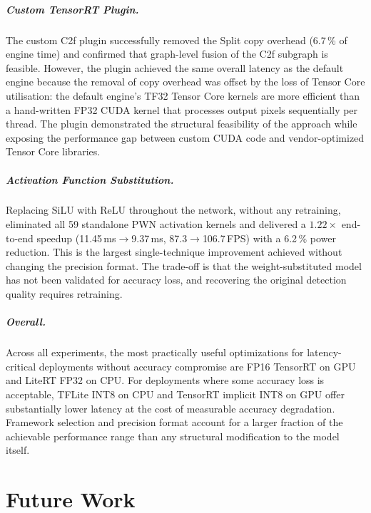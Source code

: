 \documentclass[12pt,a4paper]{report}
\begin{document}
\paragraph{Custom TensorRT Plugin.}
The custom C2f plugin successfully removed the Split copy overhead (6.7\,\% of engine time) and confirmed that
graph-level fusion of the C2f subgraph is feasible.
However, the plugin achieved the same overall latency as the default engine because the removal of copy overhead was
offset by the loss of Tensor Core utilisation: the default engine's TF32 Tensor Core kernels are more efficient than
a hand-written FP32 CUDA kernel that processes output pixels sequentially per thread.
The plugin demonstrated the structural feasibility of the approach while exposing the performance gap between custom
CUDA code and vendor-optimized Tensor Core libraries.

\paragraph{Activation Function Substitution.}
Replacing SiLU with ReLU throughout the network, without any retraining, eliminated all 59 standalone PWN activation
kernels and delivered a $1.22\times$ end-to-end speedup (11.45\,ms$\to$9.37\,ms, 87.3$\to$106.7\,FPS) with a
6.2\,\% power reduction.
This is the largest single-technique improvement achieved without changing the precision format.
The trade-off is that the weight-substituted model has not been validated for accuracy loss, and recovering the
original detection quality requires retraining.

\paragraph{Overall.}
Across all experiments, the most practically useful optimizations for latency-critical deployments without accuracy
compromise are FP16 TensorRT on GPU and LiteRT FP32 on CPU.
For deployments where some accuracy loss is acceptable, TFLite INT8 on CPU and TensorRT implicit INT8 on GPU offer
substantially lower latency at the cost of measurable accuracy degradation.
Framework selection and precision format account for a larger fraction of the achievable performance range than any
structural modification to the model itself.


\chapter{Future Work}
\label{chap:future_work}
\end{document}
